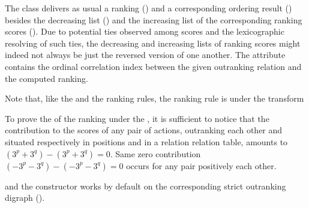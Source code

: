 \documentclass[a4paper,12pt,english]{sphinxhowto}
\begin{document}
\sphinxAtStartPar
The class delivers as usual a ranking () and a corresponding ordering result () besides the decreasing list () and the increasing list of the corresponding  ranking scores (). Due to potential ties observed among  scores and the lexicographic resolving of such ties, the decreasing and increasing lists of ranking scores might indeed not always be just the reversed version of one another. The  attribute contains the ordinal correlation index between the given outranking relation and the computed  ranking.

\sphinxAtStartPar
Note that, like the  and the  ranking rules, the  ranking rule is  under the  transform %
\begin{footnote}[22]\sphinxAtStartFootnote
To prove the  of the  ranking under the , it is sufficient to notice that the contribution to the  scores of any pair of actions, outranking each other and situated respectively in positions  and  in a relation relation table, amounts to  \((3^p + 3^q) - (3^p + 3^q) = 0\). Same zero contribution \((-3^p - 3^q) - (-3^p - 3^q) = 0\) occurs for any pair positively  each other.
%
\end{footnote} and the  constructor works by default on the corresponding strict outranking digraph ().
\end{document}
